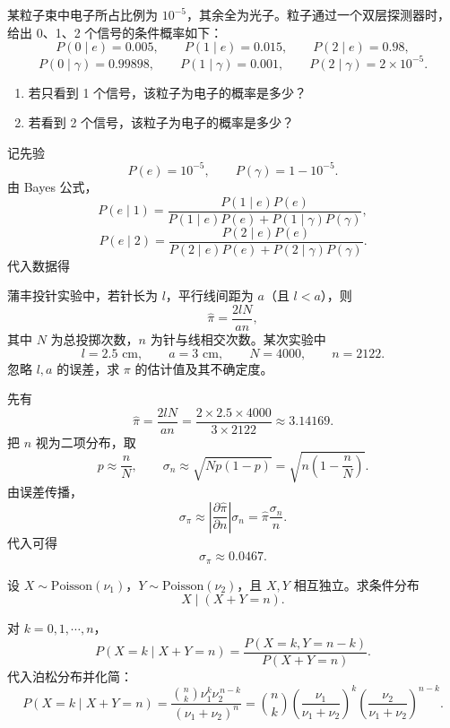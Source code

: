 \begin{question}
某粒子束中电子所占比例为 $10^{-5}$，其余全为光子。粒子通过一个双层探测器时，给出 0、1、2 个信号的条件概率如下：
\[
P(0\mid e)=0.005,\qquad P(1\mid e)=0.015,\qquad P(2\mid e)=0.98,
\]
\[
P(0\mid \gamma)=0.99898,\qquad P(1\mid \gamma)=0.001,\qquad P(2\mid \gamma)=2\times10^{-5}.
\]
\begin{enumerate}[label=(\alph*),leftmargin=2.8em,itemsep=0.2em]
\item 若只看到 1 个信号，该粒子为电子的概率是多少？
\item 若看到 2 个信号，该粒子为电子的概率是多少？
\end{enumerate}
\begin{solution}
记先验
\[
P(e)=10^{-5},\qquad P(\gamma)=1-10^{-5}.
\]
由 Bayes 公式，
\[
P(e\mid 1)=\frac{P(1\mid e)P(e)}{P(1\mid e)P(e)+P(1\mid \gamma)P(\gamma)},
\]
\[
P(e\mid 2)=\frac{P(2\mid e)P(e)}{P(2\mid e)P(e)+P(2\mid \gamma)P(\gamma)}.
\]
代入数据得
\end{solution}
\end{question}

\begin{question}
蒲丰投针实验中，若针长为 $l$，平行线间距为 $a$（且 $l<a$），则
\[
\hat\pi=\frac{2lN}{an},
\]
其中 $N$ 为总投掷次数，$n$ 为针与线相交次数。某次实验中
\[
l=2.5\text{ cm},\qquad a=3\text{ cm},\qquad N=4000,\qquad n=2122.
\]
忽略 $l,a$ 的误差，求 $\pi$ 的估计值及其不确定度。
\begin{solution}
先有
\[
\hat\pi=\frac{2lN}{an}
=\frac{2\times 2.5\times 4000}{3\times 2122}
\approx 3.14169.
\]
把 $n$ 视为二项分布，取
\[
p\approx \frac{n}{N},
\qquad
\sigma_n\approx \sqrt{Np(1-p)}
=\sqrt{n\left(1-\frac{n}{N}\right)}.
\]
由误差传播，
\[
\sigma_{\pi}\approx \left|\frac{\partial \hat\pi}{\partial n}\right|\sigma_n
=\hat\pi\frac{\sigma_n}{n}.
\]
代入可得
\[
\sigma_\pi\approx 0.0467.
\]
\end{solution}
\end{question}

\begin{question}
设 $X\sim \mathrm{Poisson}(\nu_1)$，$Y\sim \mathrm{Poisson}(\nu_2)$，且 $X,Y$ 相互独立。求条件分布
\[
X\mid (X+Y=n).
\]
\begin{solution}
对 $k=0,1,\cdots,n$，
\[
P(X=k\mid X+Y=n)
=\frac{P(X=k,Y=n-k)}{P(X+Y=n)}.
\]
代入泊松分布并化简：
\[
P(X=k\mid X+Y=n)
=\frac{\binom{n}{k}\nu_1^k\nu_2^{\,n-k}}{(\nu_1+\nu_2)^n}
=\binom{n}{k}\left(\frac{\nu_1}{\nu_1+\nu_2}\right)^k
\left(\frac{\nu_2}{\nu_1+\nu_2}\right)^{n-k}.
\]
\end{solution}
\end{question}

